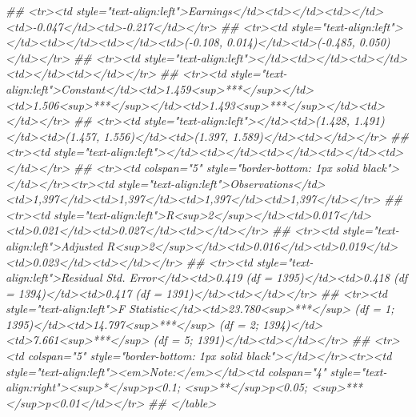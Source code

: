 \documentclass[
]{article}
\newenvironment{Shaded}{\begin{snugshade}}{\end{snugshade}}
\newcommand{\CommentTok}[1]{\textcolor[rgb]{0.56,0.35,0.01}{\textit{#1}}}
\begin{document}
\begin{Shaded}
\begin{Highlighting}[]
{{{{{{{{{{\CommentTok{## <tr><td style="text-align:left">Earnings</td><td></td><td></td><td>-0.047</td><td>-0.217</td></tr>}
\CommentTok{## <tr><td style="text-align:left"></td><td></td><td></td><td>(-0.108, 0.014)</td><td>(-0.485, 0.050)</td></tr>}
\CommentTok{## <tr><td style="text-align:left"></td><td></td><td></td><td></td><td></td></tr>}
\CommentTok{## <tr><td style="text-align:left">Constant</td><td>1.459<sup>***</sup></td><td>1.506<sup>***</sup></td><td>1.493<sup>***</sup></td><td></td></tr>}
\CommentTok{## <tr><td style="text-align:left"></td><td>(1.428, 1.491)</td><td>(1.457, 1.556)</td><td>(1.397, 1.589)</td><td></td></tr>}
\CommentTok{## <tr><td style="text-align:left"></td><td></td><td></td><td></td><td></td></tr>}
\CommentTok{## <tr><td colspan="5" style="border-bottom: 1px solid black"></td></tr><tr><td style="text-align:left">Observations</td><td>1,397</td><td>1,397</td><td>1,397</td><td>1,397</td></tr>}
\CommentTok{## <tr><td style="text-align:left">R<sup>2</sup></td><td>0.017</td><td>0.021</td><td>0.027</td><td></td></tr>}
\CommentTok{## <tr><td style="text-align:left">Adjusted R<sup>2</sup></td><td>0.016</td><td>0.019</td><td>0.023</td><td></td></tr>}
\CommentTok{## <tr><td style="text-align:left">Residual Std. Error</td><td>0.419 (df = 1395)</td><td>0.418 (df = 1394)</td><td>0.417 (df = 1391)</td><td></td></tr>}
\CommentTok{## <tr><td style="text-align:left">F Statistic</td><td>23.780<sup>***</sup> (df = 1; 1395)</td><td>14.797<sup>***</sup> (df = 2; 1394)</td><td>7.661<sup>***</sup> (df = 5; 1391)</td><td></td></tr>}
\CommentTok{## <tr><td colspan="5" style="border-bottom: 1px solid black"></td></tr><tr><td style="text-align:left"><em>Note:</em></td><td colspan="4" style="text-align:right"><sup>*</sup>p<0.1; <sup>**</sup>p<0.05; <sup>***</sup>p<0.01</td></tr>}
\CommentTok{## </table>}


}}}}}}}}}}
\end{Highlighting}
\end{Shaded}
\end{document}
